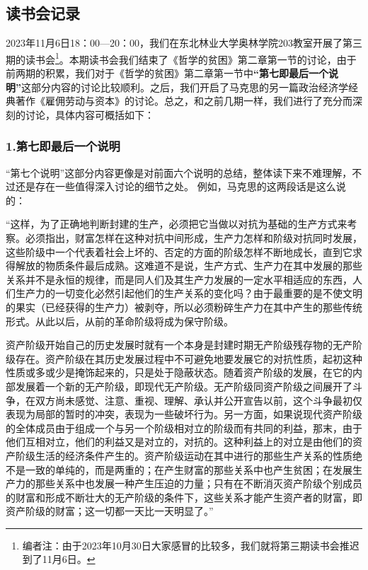 \documentclass[a4paper,twoside,12pt,AutoFakeBold]{ctexart}
\begin{document}
\subsection{读书会记录}
2023年11月6日18：00—20：00，我们在东北林业大学奥林学院203教室开展了第三期的读书会\footnote{编者注：由于2023年10月30日大家感冒的比较多，我们就将第三期读书会推迟到了11月6日。}。本期读书会我们结束了《哲学的贫困》第二章第一节的讨论，由于前两期的积累，我们对于《哲学的贫困》第二章第一节中\textbf{“第七即最后一个说明”}这部分内容的讨论比较顺利。之后，我们开启了马克思的另一篇政治经济学经典著作《雇佣劳动与资本》的讨论。总之，和之前几期一样，我们进行了充分而深刻的讨论，具体内容可概括如下：

\subsubsection{1.第七即最后一个说明}
“第七个说明”这部分内容更像是对前面六个说明的总结，整体读下来不难理解，不过还是存在一些值得深入讨论的细节之处。
例如，马克思的这两段话是这么说的：

\begin{adjustwidth}{2em}{2em}
    \qquad\fangsong
 “这样，为了正确地判断封建的生产，必须把它当做以对抗为基础的生产方式来考察。必须指出，财富怎样在这种对抗中间形成，生产力怎样和阶级对抗同时发展，这些阶级中一个代表着社会上坏的、否定的方面的阶级怎样不断地成长，直到它求得解放的物质条件最后成熟。这难道不是说，生产方式、生产力在其中发展的那些关系并不是永恒的规律，而是同人们及其生产力发展的一定水平相适应的东西，人们生产力的一切变化必然引起他们的生产关系的变化吗？由于最重要的是不使文明的果实（已经获得的生产力）被剥夺，所以必须粉碎生产力在其中产生的那些传统形式。从此以后，从前的革命阶级将成为保守阶级。

资产阶级开始自己的历史发展时就有一个本身是封建时期无产阶级残存物的无产阶级存在。资产阶级在其历史发展过程中不可避免地要发展它的对抗性质，起初这种性质或多或少是掩饰起来的，只是处于隐蔽状态。随着资产阶级的发展，在它的内部发展着一个新的无产阶级，即现代无产阶级。无产阶级同资产阶级之间展开了斗争，在双方尚未感觉、注意、重视、理解、承认并公开宣告以前，这个斗争最初仅表现为局部的暂时的冲突，表现为一些破坏行为。另一方面，如果说现代资产阶级的全体成员由于组成一个与另一个阶级相对立的阶级而有共同的利益，那末，由于他们互相对立，他们的利益又是对立的，对抗的。这种利益上的对立是由他们的资产阶级生活的经济条件产生的。资产阶级运动在其中进行的那些生产关系的性质绝不是一致的单纯的，而是两重的；在产生财富的那些关系中也产生贫困；在发展生产力的那些关系中也发展一种产生压迫的力量；只有在不断消灭资产阶级个别成员的财富和形成不断壮大的无产阶级的条件下，这些关系才能产生资产者的财富，即资产阶级的财富；这一切都一天比一天明显了。”
\end{adjustwidth}
\end{document}
